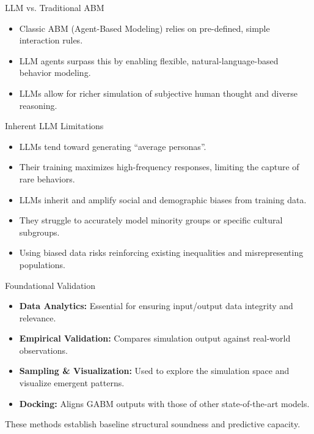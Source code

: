 \documentclass[24pt]{beamer}
\begin{document}
\begin{frame}{LLM vs. Traditional ABM}
	\begin{itemize}
		\item Classic ABM (Agent-Based Modeling) relies on pre-defined, simple interaction rules.
		\item LLM agents surpass this by enabling flexible, natural-language-based behavior modeling.
		\item LLMs allow for richer simulation of subjective human thought and diverse reasoning.
	\end{itemize}
\end{frame}

\begin{frame}{Inherent LLM Limitations}
	\begin{itemize}
		\item LLMs tend toward generating ``average personas''.
		\item Their training maximizes high-frequency responses, limiting the capture of rare behaviors.
		\item LLMs inherit and amplify social and demographic biases from training data.
		\item They struggle to accurately model minority groups or specific cultural subgroups.
		\item Using biased data risks reinforcing existing inequalities and misrepresenting populations.
	\end{itemize}
\end{frame}

\begin{frame}{Foundational Validation}
	\begin{itemize}
		\item \textbf{Data Analytics:} Essential for ensuring input/output data integrity and relevance.
		\item \textbf{Empirical Validation:} Compares simulation output against real-world observations.
		\item \textbf{Sampling \& Visualization:} Used to explore the simulation space and visualize emergent patterns.
		\item \textbf{Docking:} Aligns GABM outputs with those of other state-of-the-art models.
	\end{itemize}
	\vspace{0.5em}
	\small These methods establish baseline structural soundness and predictive capacity.
\end{frame}
\end{document}
